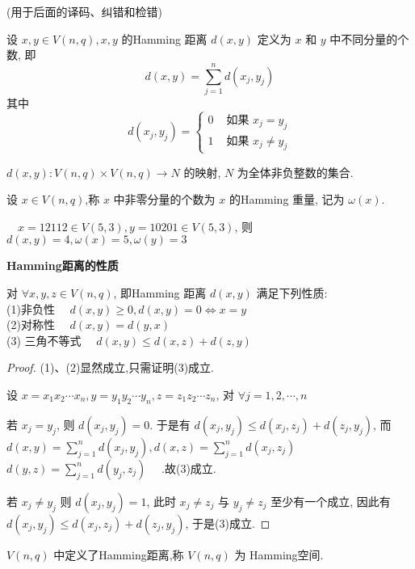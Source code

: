 (用于后面的译码、纠错和检错)

\begin{definition}
    设 $ x, y \in V(n, q), x, y $ 的Hamming 距离 $ d(x, y) $ 定义为 $ x $ 和 $ y $ 中不同分量的个数, 即
$$
d(x, y)=\sum_{j=1}^{n} d\left(x_{j}, y_{j}\right)
$$
其中
$$
d\left(x_{j}, y_{j}\right)=\left\{\begin{array}{ll}
0 & \text { 如果 } x_{j}=y_{j} \\
1 & \text { 如果 } x_{j} \neq y_{j}
\end{array}\right.
$$
\end{definition}
\begin{remark}
    $ d(x, y): V(n, q) \times V(n, q) \longrightarrow N $ 的映射, $ N $ 为全体非负整数的集合.
\end{remark}

\begin{definition}
     设 $ x \in V(n, q) $,称 $ x $ 中非零分量的个数为 $ x $ 的Hamming 重量, 记为 $ \omega(x) $.
\end{definition}

\begin{example}
     $ \quad x=12112 \in V(5,3), y=10201 \in V(5,3) $,
则 $ d(x, y)=4, \omega(x)=5, \omega(y)=3 $
\end{example}
\textbf{Hamming距离的性质}
\begin{theorem}
     对 $ \forall x, y, z \in V(n, q) $, 即Hamming 距离 $ d(x, y) $ 满足下列性质:\\
(1)非负性 $\quad d(x, y) \geq 0, d(x, y)=0 \Longleftrightarrow x=y $\\
(2)对称性 $ \quad d(x, y)=d(y, x) $\\
(3) 三角不等式 $ \quad d(x, y) \leq d(x, z)+d(z, y) $
\end{theorem}
\begin{proof}
(1)、(2)显然成立,只需证明(3)成立.

设 $ x=x_{1} x_{2} \cdots x_{n}, y=y_{1} y_{2} \cdots y_{n}, z=z_{1} z_{2} \cdots z_{n} $, 
对 $ \forall j=1,2, \cdots, n $

 若 $ x_{j}=y_{j} $, 则 $ d\left(x_{j}, y_{j}\right)=0 $.
于是有 $ d\left(x_{j}, y_{j}\right) \leq d\left(x_{j}, z_{j}\right)+d\left(z_{j}, y_{j}\right) $,
而 $ d(x, y)=\sum\limits_{j=1}^{n} d\left(x_{j}, y_{j}\right), d(x, z)=\sum\limits_{j=1}^{n} d\left(x_{j}, z_{j}\right) $
$ d(y, z)=\sum\limits_{j=1}^{n} d\left(y_{j}, z_{j}\right) \quad $ .故(3)成立.

若 $ x_{j} \neq y_{j} $ 则 $ d\left(x_{j}, y_{j}\right)=1 $, 此时 $ x_{j} \neq z_{j} $ 与 $ y_{j} \neq z_{j} $ 至少有一个成立, 因此有 $ d\left(x_{j}, y_{j}\right) \leq d\left(x_{j}, z_{j}\right)+d\left(z_{j}, y_{j}\right) $, 于是(3)成立.
\end{proof}
\begin{remark}
 $ V(n, q) $ 中定义了Hamming距离,称 $ V(n, q) $ 为 Hamming空间.
\end{remark}

